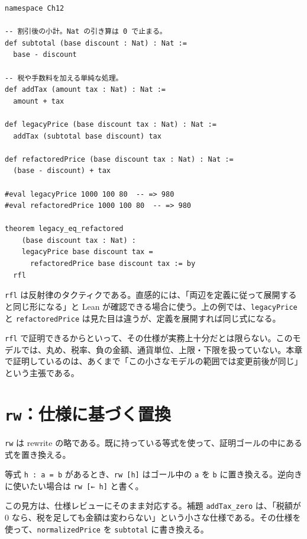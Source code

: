 \begin{listing}[htbp]
\begin{verbatim}
namespace Ch12

-- 割引後の小計。Nat の引き算は 0 で止まる。
def subtotal (base discount : Nat) : Nat :=
  base - discount

-- 税や手数料を加える単純な処理。
def addTax (amount tax : Nat) : Nat :=
  amount + tax

def legacyPrice (base discount tax : Nat) : Nat :=
  addTax (subtotal base discount) tax

def refactoredPrice (base discount tax : Nat) : Nat :=
  (base - discount) + tax

#eval legacyPrice 1000 100 80  -- => 980
#eval refactoredPrice 1000 100 80  -- => 980

theorem legacy_eq_refactored
    (base discount tax : Nat) :
    legacyPrice base discount tax =
      refactoredPrice base discount tax := by
  rfl
\end{verbatim}
\caption{価格計算の最小モデル}
\label{lst:ch12-price-model}
\end{listing}

\texttt{rfl} は反射律のタクティクである。直感的には、「両辺を定義に従って展開すると同じ形になる」と Lean が確認できる場合に使う。上の例では、\texttt{legacyPrice} と \texttt{refactoredPrice} は見た目は違うが、定義を展開すれば同じ式になる。

\begin{warningbox}
\texttt{rfl} で証明できるからといって、その仕様が実務上十分だとは限らない。このモデルでは、丸め、税率、負の金額、通貨単位、上限・下限を扱っていない。本章で証明しているのは、あくまで「この小さなモデルの範囲では変更前後が同じ」という主張である。
\end{warningbox}

\section{\texttt{rw}：仕様に基づく置換}

\texttt{rw} は rewrite の略である。既に持っている等式を使って、証明ゴールの中にある式を置き換える。

\begin{definitionbox}
等式 \texttt{h : a = b} があるとき、\texttt{rw [h]} はゴール中の \texttt{a} を \texttt{b} に置き換える。逆向きに使いたい場合は \texttt{rw [← h]} と書く。
\end{definitionbox}

この見方は、仕様レビューにそのまま対応する。補題 \texttt{addTax\_zero} は、「税額が 0 なら、税を足しても金額は変わらない」という小さな仕様である。その仕様を使って、\texttt{normalizedPrice} を \texttt{subtotal} に書き換える。

